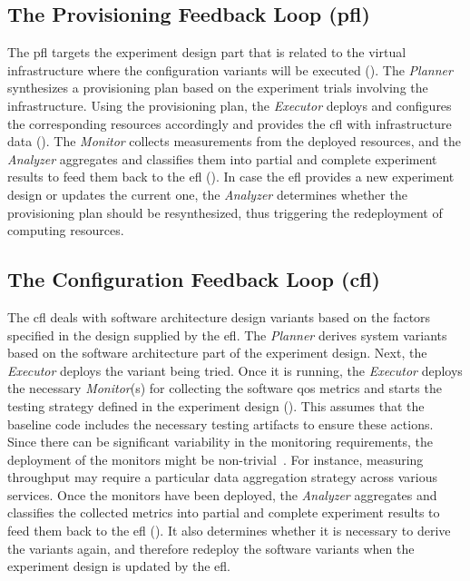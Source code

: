 \subsection{The Provisioning Feedback Loop (\acrshort{pfl})}
\label{subsect:architectural-framework--P-FL}

The \gls{pfl} targets the experiment design part that is related to the virtual infrastructure where the configuration variants will be executed (). The \emph{Planner} synthesizes a provisioning plan based on the experiment trials involving the infrastructure. Using the provisioning plan, the \emph{Executor} deploys and configures the corresponding resources accordingly and provides the \gls{cfl} with infrastructure data (). The \emph{Monitor} collects measurements from the deployed resources, and the \emph{Analyzer} aggregates and classifies them into partial and complete experiment results to feed them back to the \gls{efl} (). In case the \gls{efl} provides a new experiment design or updates the current one, the \emph{Analyzer} determines whether the provisioning plan should be resynthesized, thus triggering the redeployment of computing resources.

\subsection{The Configuration Feedback Loop (\acrshort{cfl})}
\label{subsect:architectural-framework--C-FL}

The \gls{cfl} deals with software architecture design variants based on the factors specified in the design supplied by the \gls{efl}. The \emph{Planner} derives system variants based on the software architecture part of the experiment design. Next, the \emph{Executor} deploys the variant being tried. Once it is running, the \emph{Executor} deploys the necessary \emph{Monitor}(s) for collecting the software \gls{qos} metrics and starts the testing strategy defined in the experiment design (). This assumes that the baseline code includes the necessary testing artifacts to ensure these actions. Since there can be significant variability in the monitoring requirements, the deployment of the monitors might be non-trivial~\cite{villegas-2013-context}. For instance, measuring throughput may require a particular data aggregation strategy across various services. Once the monitors have been deployed, the \emph{Analyzer} aggregates and classifies the collected metrics into partial and complete experiment results to feed them back to the \gls{efl} (). It also determines whether it is necessary to derive the variants again, and therefore redeploy the software variants when the experiment design is updated by the \gls{efl}.


